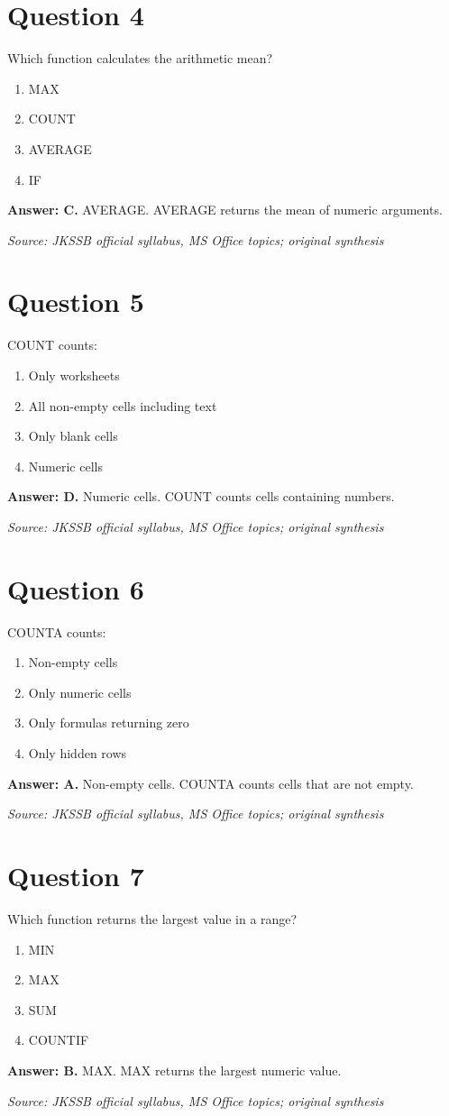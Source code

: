 \documentclass[11pt,a4paper]{book}
\newcommand{\source}[1]{\par\smallskip\textit{Source: #1}}
\newcommand{\answer}[2]{\par\textbf{Answer: #1.} #2}
\begin{document}
\section*{Question 4}
Which function calculates the arithmetic mean?
\begin{enumerate}[label=\Alph*.]
\item MAX
\item COUNT
\item AVERAGE
\item IF
\end{enumerate}
\answer{C}{AVERAGE. AVERAGE returns the mean of numeric arguments.}
\source{JKSSB official syllabus, MS Office topics; original synthesis}
\section*{Question 5}
COUNT counts:
\begin{enumerate}[label=\Alph*.]
\item Only worksheets
\item All non-empty cells including text
\item Only blank cells
\item Numeric cells
\end{enumerate}
\answer{D}{Numeric cells. COUNT counts cells containing numbers.}
\source{JKSSB official syllabus, MS Office topics; original synthesis}
\section*{Question 6}
COUNTA counts:
\begin{enumerate}[label=\Alph*.]
\item Non-empty cells
\item Only numeric cells
\item Only formulas returning zero
\item Only hidden rows
\end{enumerate}
\answer{A}{Non-empty cells. COUNTA counts cells that are not empty.}
\source{JKSSB official syllabus, MS Office topics; original synthesis}
\section*{Question 7}
Which function returns the largest value in a range?
\begin{enumerate}[label=\Alph*.]
\item MIN
\item MAX
\item SUM
\item COUNTIF
\end{enumerate}
\answer{B}{MAX. MAX returns the largest numeric value.}
\source{JKSSB official syllabus, MS Office topics; original synthesis}
\end{document}

